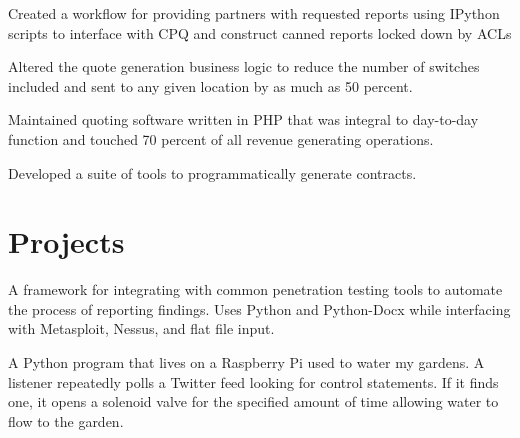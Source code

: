 \documentclass[]{deedy-resume-openfont}
\begin{document}
\begin{minipage}[t]{0.70\textwidth}
\vspace{\topsep}
\begin{tightemize}
\item Created a workflow for providing partners with requested reports using IPython scripts to interface with CPQ and construct canned reports locked down by ACLs
\item Altered the quote generation business logic to reduce the number of switches included and sent to any given location by as much as 50 percent.
\end{tightemize}
\sectionsep

\begin{tightemize}
\item Maintained quoting software written in PHP that was integral to day-to-day function and touched 70 percent of all revenue generating operations.
\item Developed a suite of tools to programmatically generate contracts.
\end{tightemize}
\sectionsep


\section{Projects}
A framework for integrating with common penetration testing tools to automate the process of reporting findings. Uses Python and Python-Docx while interfacing with Metasploit, Nessus, and flat file input.
\sectionsep

A Python program that lives on a Raspberry Pi used to water my gardens. A listener repeatedly polls a Twitter feed looking for control statements. If it finds one, it opens a solenoid valve for the specified amount of time allowing water to flow to the garden.
\sectionsep

\end{minipage} 
\end{document}

